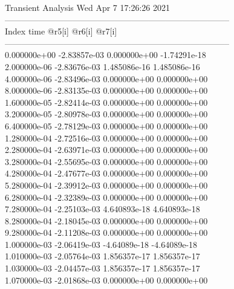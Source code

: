                                    Transient Analysis  Wed Apr  7 17:26:26  2021\\ \hline
--------------------------------------------------------------------------------\\ \hline
Index   time            @r5[i]          @r6[i]          @r7[i]          \\ \hline
--------------------------------------------------------------------------------\\ 	0.000000e+00	-2.83857e-03	0.000000e+00	-1.74291e-18	\\ 	2.000000e-06	-2.83676e-03	1.485086e-16	1.485086e-16	\\ 	4.000000e-06	-2.83496e-03	0.000000e+00	0.000000e+00	\\ 	8.000000e-06	-2.83135e-03	0.000000e+00	0.000000e+00	\\ 	1.600000e-05	-2.82414e-03	0.000000e+00	0.000000e+00	\\ 	3.200000e-05	-2.80978e-03	0.000000e+00	0.000000e+00	\\ 	6.400000e-05	-2.78129e-03	0.000000e+00	0.000000e+00	\\ 	1.280000e-04	-2.72516e-03	0.000000e+00	0.000000e+00	\\ 	2.280000e-04	-2.63971e-03	0.000000e+00	0.000000e+00	\\ 	3.280000e-04	-2.55695e-03	0.000000e+00	0.000000e+00	\\ 	4.280000e-04	-2.47677e-03	0.000000e+00	0.000000e+00	\\ 	5.280000e-04	-2.39912e-03	0.000000e+00	0.000000e+00	\\ 	6.280000e-04	-2.32389e-03	0.000000e+00	0.000000e+00	\\ 	7.280000e-04	-2.25103e-03	4.640893e-18	4.640893e-18	\\ 	8.280000e-04	-2.18045e-03	0.000000e+00	0.000000e+00	\\ 	9.280000e-04	-2.11208e-03	0.000000e+00	0.000000e+00	\\ 	1.000000e-03	-2.06419e-03	-4.64089e-18	-4.64089e-18	\\ 	1.010000e-03	-2.05764e-03	1.856357e-17	1.856357e-17	\\ 	1.030000e-03	-2.04457e-03	1.856357e-17	1.856357e-17	\\ 	1.070000e-03	-2.01868e-03	0.000000e+00	0.000000e+00	\\ \hline
